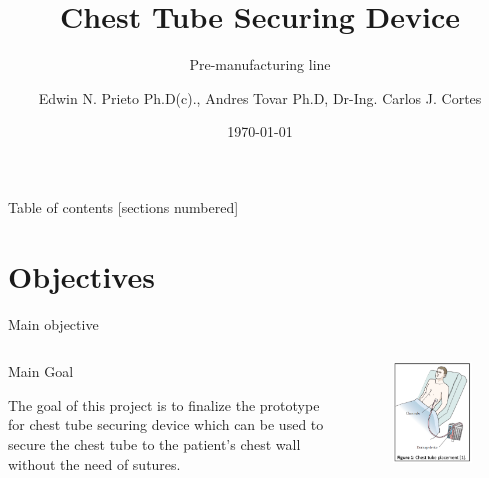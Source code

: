 \documentclass[10pt]{beamer}
\title{Chest Tube Securing Device}
\subtitle{Pre-manufacturing line}
\date{\today}
\date{}
\author{Edwin N. Prieto Ph.D(c)., Andres Tovar Ph.D, Dr-Ing. Carlos J. Cortes}
\institute{\textbf{Universidad Nacional de Colombia - Indiana University Purdue University}}
\begin{document}
\maketitle
%


\begin{frame}{Table of contents}
  [sections numbered]
  \tableofcontents[]
\end{frame}

\section{Objectives}

\begin{frame}[fragile]{Main objective}
\begin{columns}[T,onlytextwidth]
\vspace{13mm}
\begin{alertblock}{Main Goal}

The goal of this project is to finalize the prototype for chest tube securing device which can be used to secure the chest tube to the patient’s chest wall without the need of sutures. 

\end{alertblock}
\begin{figure}
\includegraphics[scale=0.5]{State-art.png}
\end{figure}
\end{columns}
\end{frame}
\end{document}
